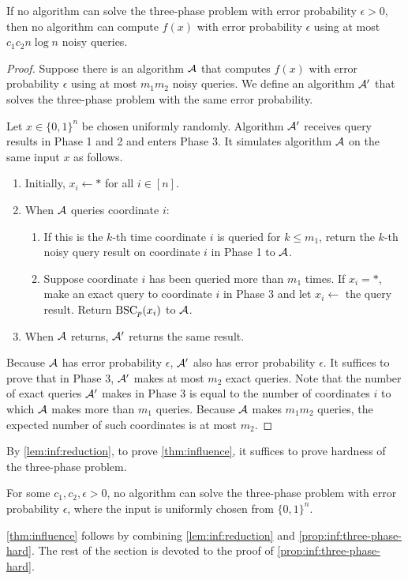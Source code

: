 \begin{lemma} \label{lem:inf:reduction}
  If no algorithm can solve the three-phase problem with error probability $\epsilon>0$, then no algorithm can compute $f(x)$ with error probability $\epsilon$ using at most $c_1 c_2 n\log n$ noisy queries.
\end{lemma}
\begin{proof}
  Suppose there is an algorithm $\mathcal{A}$ that computes $f(x)$ with error probability $\epsilon$ using at most $m_1 m_2$ noisy queries.
  We define an algorithm $\mathcal{A}'$ that solves the three-phase problem with the same error probability.

  Let $x\in \{0,1\}^n$ be chosen uniformly randomly.
  Algorithm $\mathcal{A}'$ receives query results in Phase 1 and 2 and enters Phase 3.
  It simulates algorithm $\mathcal{A}$ on the same input $x$ as follows.
  \begin{enumerate}[label=(\arabic*)]
    \item Initially, $x_i\gets *$ for all $i\in [n]$.
    \item When $\mathcal{A}$ queries coordinate $i$:
    \begin{enumerate}[label=(\alph*)]
      \item If this is the $k$-th time coordinate $i$ is queried for $k \le m_1$, return the $k$-th noisy query result on coordinate $i$ in Phase 1 to $\mathcal{A}$.
      \item Suppose coordinate $i$ has been queried more than $m_1$ times. If $x_i=*$, make an exact query to coordinate $i$ in Phase 3 and let $x_i\gets$ the query result.
      Return $\operatorname{\mathrm{BSC}}_p(x_i)$ to $\mathcal{A}$.
    \end{enumerate}
    \item When $\mathcal{A}$ returns, $\mathcal{A}'$ returns the same result.
  \end{enumerate}

  Because $\mathcal{A}$ has error probability $\epsilon$, $\mathcal{A}'$ also has error probability $\epsilon$.
  It suffices to prove that in Phase 3, $\mathcal{A}'$ makes at most $m_2$ exact queries.
  Note that the number of exact queries $\mathcal{A}'$ makes in Phase 3 is equal to the number of coordinates $i$ to which $\mathcal{A}$ makes more than $m_1$ queries.
  Because $\mathcal{A}$ makes $m_1 m_2$ queries, the expected number of such coordinates is at most $m_2$.
\end{proof}

By \cref{lem:inf:reduction}, to prove \cref{thm:influence}, it suffices to prove hardness of the three-phase problem.

\begin{proposition} \label{prop:inf:three-phase-hard}
  For some $c_1,c_2,\epsilon>0$, no algorithm can solve the three-phase problem with error probability $\epsilon$, where the input is uniformly chosen from $\{0,1\}^n$.
\end{proposition}
\cref{thm:influence} follows by combining \cref{lem:inf:reduction} and \cref{prop:inf:three-phase-hard}. The rest of the section is devoted to the proof of \cref{prop:inf:three-phase-hard}.

